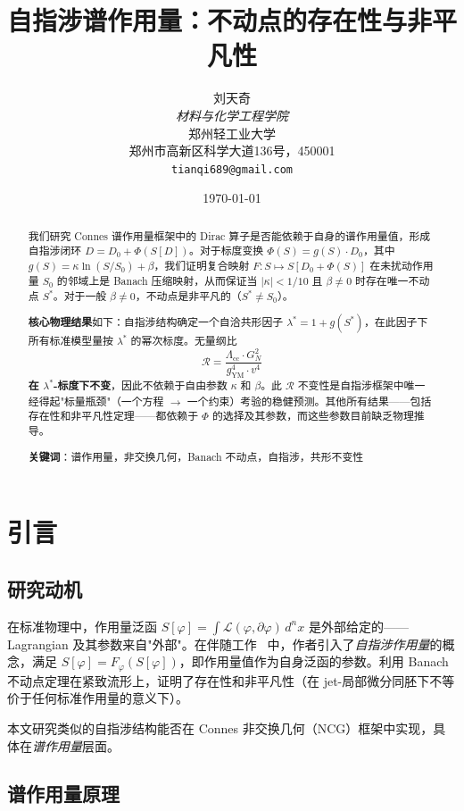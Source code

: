 \documentclass[11pt,a4paper]{ctexart}
\title{\textbf{自指涉谱作用量：不动点的存在性与非平凡性}}
\author{刘天奇\\
  \textit{材料与化学工程学院}\\
  郑州轻工业大学\\
  郑州市高新区科学大道136号，450001\\
  \texttt{tianqi689@gmail.com}}
\date{\today}
\theoremstyle{remark}
\newcommand{\R}{\mathcal{R}}
\newcommand{\Lcc}{\Lambda_{\mathrm{cc}}}
\newcommand{\GN}{G_N}
\newcommand{\gYM}{g_{\mathrm{YM}}}
\begin{document}
\maketitle

\begin{abstract}
我们研究 Connes 谱作用量框架中的 Dirac 算子是否能依赖于自身的谱作用量值，形成自指涉闭环 $D = D_0 + \Phi(S[D])$。对于标度变换 $\Phi(S) = g(S) \cdot D_0$，其中 $g(S) = \kappa \ln(S/S_0) + \beta$，我们证明复合映射 $F: S \mapsto S[D_0 + \Phi(S)]$ 在未扰动作用量 $S_0$ 的邻域上是 Banach 压缩映射，从而保证当 $|\kappa| < 1/10$ 且 $\beta \neq 0$ 时存在唯一不动点 $S^*$。对于一般 $\beta \neq 0$，不动点是非平凡的（$S^* \neq S_0$）。

\medskip

\noindent\textbf{核心物理结果}如下：自指涉结构确定一个自洽共形因子 $\lambda^* = 1 + g(S^*)$，在此因子下所有标准模型量按 $\lambda^*$ 的幂次标度。无量纲比
\[
  \R = \frac{\Lcc \cdot \GN^2}{\gYM^4 \cdot v^4}
\]
\textbf{在 $\lambda^*$-标度下不变}，因此不依赖于自由参数 $\kappa$ 和 $\beta$。此 $\R$ 不变性是自指涉框架中唯一经得起"标量瓶颈"（一个方程 $\to$ 一个约束）考验的稳健预测。其他所有结果——包括存在性和非平凡性定理——都依赖于 $\Phi$ 的选择及其参数，而这些参数目前缺乏物理推导。

\medskip

\noindent\textbf{关键词}：谱作用量，非交换几何，Banach 不动点，自指涉，共形不变性
\end{abstract}

\section{引言}

\subsection{研究动机}

在标准物理中，作用量泛函 $S[\varphi] = \int \mathcal{L}(\varphi, \partial\varphi)\,d^nx$ 是外部给定的——Lagrangian 及其参数来自"外部"。在伴随工作~\cite{PaperI} 中，作者引入了\emph{自指涉作用量}的概念，满足 $S[\varphi] = F_\varphi(S[\varphi])$，即作用量值作为自身泛函的参数。利用 Banach 不动点定理在紧致流形上，证明了存在性和非平凡性（在 jet-局部微分同胚下不等价于任何标准作用量的意义下）。

本文研究类似的自指涉结构能否在 Connes 非交换几何（NCG）框架中实现，具体在\emph{谱作用量}层面。

\subsection{谱作用量原理}
\end{document}
